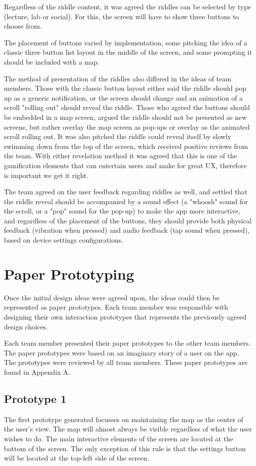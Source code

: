 \documentclass[10pt,twocolumn]{article} %
\begin{document}
Regardless of the riddle content, it was agreed the riddles can be selected by type (lecture, lab or social). For this, the screen will have to show three buttons to choose from. 

The placement of buttons varied by implementation, some pitching the idea of a classic three button list layout in the middle of the screen, and some prompting it should be included with a map.

The method of presentation of the riddles also differed in the ideas of team members. 
Those with the classic button layout either said the riddle should pop up as a generic notification, or the screen should change and an animation of a scroll "rolling out" should reveal the riddle.
Those who agreed the buttons should be embedded in a map screen, argued the riddle should not be presented as new screens, but rather overlay the map screen as pop-ups or overlay as the animated scroll rolling out.
It was also pitched the riddle could reveal itself by slowly swimming down from the top of the screen, which received positive reviews from the team.
With either revelation method it was agreed that this is one of the gamification elements that can entertain users and make for great UX, therefore is important we get it right.

The team agreed on the user feedback regarding riddles as well, and settled that the riddle reveal should be accompanied by a sound effect (a "whoosh" sound for the scroll, or a "pop" sound for the pop-up) to make the app more interactive, and regardless of the placement of the buttons, they should provide both physical feedback (vibration when pressed) and audio feedback (tap sound when pressed), based on device settings configurations.
\section*{Paper Prototyping}
Once the initial design ideas were agreed upon, the ideas could then be represented as paper prototypes. Each team member was responsible with designing their own interaction prototypes that represents the previously agreed design choices.

Each team member presented their paper prototypes to the other team members. The paper prototypes were based on an imaginary story of a user on the app. The prototypes were reviewed by all team members. These paper prototypes are found in Appendix A.

\subsection*{Prototype 1}
The first prototype generated focusses on maintaining the map as the center of the user's view. The map will almost always be visible regardless of what the user wishes to do. The main interactive elements of the screen are located at the bottom of the screen. The only exception of this rule is that the settings button will be located at the top-left side of the screen.
\end{document}
